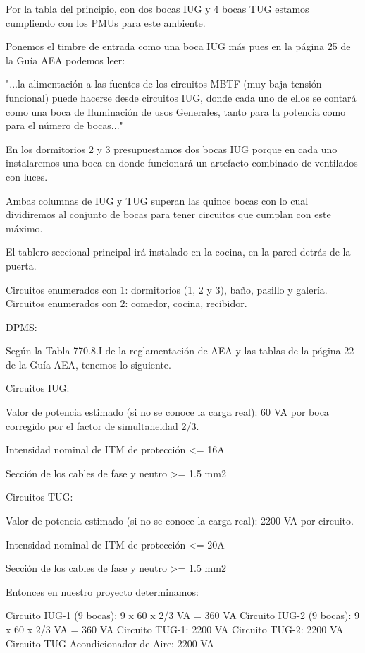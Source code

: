 Por la tabla del principio, con dos bocas IUG y 4 bocas TUG estamos cumpliendo con los PMUs para este ambiente.

Ponemos el timbre de entrada como una boca IUG más pues en la página 25 de la Guía AEA
podemos leer:

		"...la alimentación a las fuentes de los circuitos MBTF (muy baja tensión
		funcional) puede hacerse desde circuitos IUG, donde cada uno de ellos se 
		contará como una boca de Iluminación de usos Generales, tanto para la 
		potencia como para el número de bocas..."


En los dormitorios 2 y 3 presupuestamos dos bocas IUG porque en cada uno
instalaremos una boca en donde funcionará un artefacto combinado de 
ventilados con luces.


Ambas columnas de IUG y TUG superan las quince bocas con lo cual
dividiremos al conjunto de bocas para tener circuitos que cumplan
con este máximo.


El tablero seccional principal irá instalado en la cocina, en la pared
detrás de la puerta.

Circuitos enumerados con 1: dormitorios (1, 2 y 3), baño, pasillo y galería.
Circuitos enumerados con 2: comedor, cocina, recibidor.


DPMS:

Según la Tabla 770.8.I de la reglamentación de AEA y las tablas de la página
22 de la Guía AEA, tenemos lo siguiente.

Circuitos IUG:

Valor de potencia estimado (si no se conoce la carga real): 60 VA por boca
corregido por el factor de simultaneidad 2/3.

Intensidad nominal de ITM de protección <= 16A

Sección de los cables de fase y neutro >= 1.5 mm2

Circuitos TUG:

Valor de potencia estimado (si no se conoce la carga real): 2200 VA por circuito.

Intensidad nominal de ITM de protección <= 20A

Sección de los cables de fase y neutro >= 1.5 mm2



Entonces en nuestro proyecto determinamos:

Circuito IUG-1 (9 bocas): 9 x 60 x 2/3 VA = 360 VA 
Circuito IUG-2 (9 bocas): 9 x 60 x 2/3 VA = 360 VA
Circuito TUG-1:                            2200 VA
Circuito TUG-2:                            2200 VA
Circuito TUG-Acondicionador de Aire:       2200 VA  

